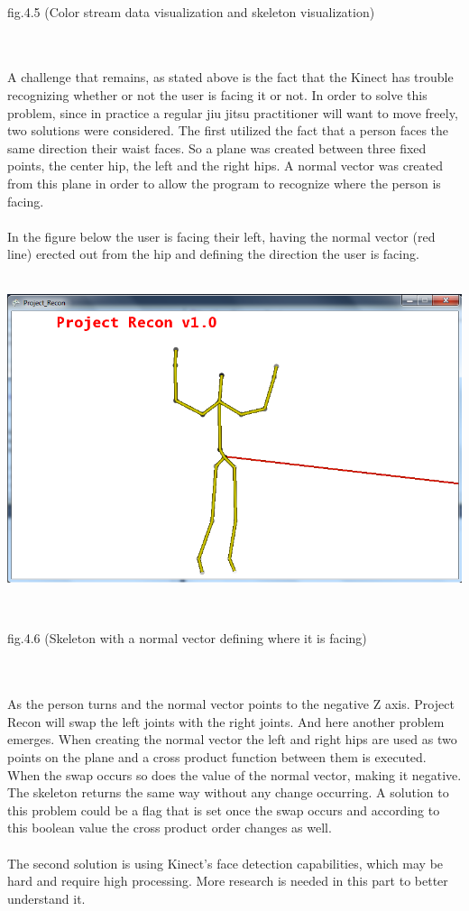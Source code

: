 \documentclass[11pt]{article} %
\begin{document}
\\
\centerline{fig.4.5 (Color stream data visualization and skeleton visualization)}
\\
\\
A challenge that remains, as stated above is the fact that the Kinect has trouble recognizing whether or not the user is facing it or not. In order to solve this problem, since in practice a regular jiu jitsu practitioner will want to move freely, two solutions were considered. The first utilized the fact that a person faces the same direction their waist faces. So a plane was created between three fixed points, the center hip, the left and the right hips. A normal vector was created from this plane in order to allow the program to recognize where the person is facing.
\\
\\
In the figure below the user is facing their left, having the normal vector (red line) erected out from the hip and defining the direction the user is facing.
\\
\\
\centerline{\includegraphics[scale=0.5]{skeleton_normal.png}}
\\
\centerline{fig.4.6 (Skeleton with a normal vector defining where it is facing)}
\\
\\
As the person turns and the normal vector points to the negative Z axis. Project Recon will swap the left joints with the right joints. And here another problem emerges. When creating the normal vector the left and right hips are used as two points on the plane and a cross product function between them is executed. When the swap occurs so does the value of the normal vector, making it negative. The skeleton returns the same way without any change occurring. A solution to this problem could be a flag that is set once the swap occurs and according to this boolean value the cross product order changes as well.
\\
\\
The second solution is using Kinect's face detection capabilities, which may be hard and require high processing. More research is needed in this part to better understand it.
\end{document}
